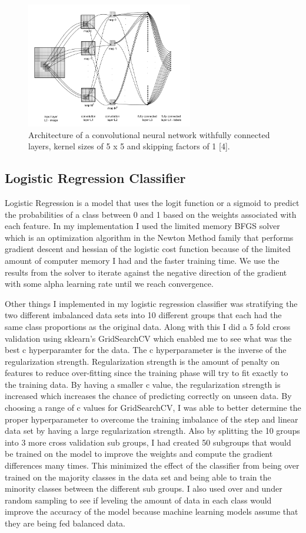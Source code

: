 \documentclass[Dealing with Imbalance in Computer Vision]{IEEEtran}
\begin{document}
\begin{figure}[]
\centerline{\includegraphics[width=275px]{layers.PNG}}
\caption{Architecture of a convolutional neural network withfully connected layers, kernel sizes of 5 x 5 and skipping factors of 1 [4].}
\label{fig3}
\end{figure}

\subsection{Logistic Regression Classifier}
Logistic Regression is a model that uses the logit function or a sigmoid to predict the probabilities of a class between 0 and 1 based on the weights associated with each feature. In my implementation I used the limited memory BFGS solver which is an optimization algorithm in the Newton Method family that performs gradient descent and hessian of the logistic cost function because of the limited amount of computer memory I had and the faster training time. We use the results from the solver to iterate against the negative direction of the gradient with some alpha learning rate until we reach convergence.

Other things I implemented in my logistic regression classifier was stratifying the two different imbalanced data sets into 10 different groups that each had the same class proportions as the original data. Along with this I did a 5 fold cross validation using sklearn's GridSearchCV which enabled me to see what was the best c hyperparamter for the data. The c hyperparameter is the inverse of the regularization strength. Regularization strength is the amount of penalty on features to reduce over-fitting since the training phase will try to fit exactly to the training data. By having a smaller c value, the regularization strength is increased which increases the chance of predicting correctly on unseen data. By choosing a range of c values for GridSearchCV, I was able to better determine the proper hyperparameter to overcome the training imbalance of the step and linear data set by having a large regularization strength. Also by splitting the 10 groups into 3 more cross validation sub groups, I had created 50 subgroups that would be trained on the model to improve the weights and compute the gradient differences many times. This minimized the effect of the classifier from being over trained on the majority classes in the data set and being able to train the minority classes between the different sub groups. I also used over and under random sampling to see if leveling the amount of data in each class would improve the accuracy of the model because machine learning models assume that they are being fed balanced data.
\end{document}
